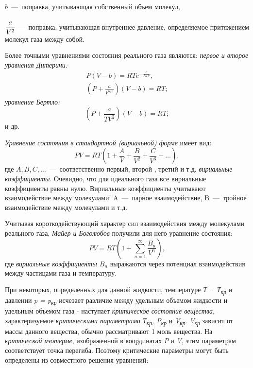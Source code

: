 $b$~---~поправка, учитывающая собственный объем молекул,

$\cfrac{a}{V^2}$~---~поправка, учитывающая внутреннее
давление, определяемое притяжением молекул газа между собой.

Более точными уравнениями состояния реального газа являются: \emph{первое и второе уравнения Дитеричи:}
\begin{gather}
  P(V-b) = RT e^{-\frac{a}{RTV}},\\
  \left (P + \frac{a}{V^{5/3}}\right )(V -b) = RT;
\end{gather}
\emph{уравнение Бертло:}
\begin{equation}
  \left (P + \frac{a}{TV^2}\right )(V -b) = RT;
\end{equation}
и др.

\emph{Уравнение состояния в стандартной (вириальной) форме} имеет вид:
\begin{equation}
  PV = RT\left ( 1+ \frac{A}{V} + \frac{B}{V^2} + \frac{C}{V^3} + \dots \right ),
\end{equation}
где $A, B, C, \dots$~---~соответственно первый, второй , третий и т.д. \emph{вириальные} \emph{коэффициенты}. Очевидно, что для идеального газа все вириальные коэффициенты равны нулю. Вириальные коэффициенты учитывают взаимодействие между молекулами: A~---~парное взаимодействие, B~---~тройное взаимодействие между молекулами и т.д.

Учитывая короткодействующий характер сил взаимодействия между молекулами
реального газа, \emph{Майер и Боголюбов} получили для него уравнение состояния:
\begin{equation}
  PV = RT \left ( 1+ \sum\limits_{n=1}^\infty\frac{B_n}{V^n}\right ),
\end{equation}
где \emph{вириальные коэффициенты $B_n$} выражаются через потенциал взаимодействия между частицами газа и температуру.

При некоторых, определенных для данной жидкости, температуре \emph{Т =
Т\textsubscript{кр}} и давлении \emph{p = p\textsubscript{кр}} исчезает
различие между удельным объемом жидкости и удельным объемом газа -
наступает \emph{критическое состояние вещества}, характеризуемое
\emph{критическими параметрами Т\textsubscript{кр}, P\textsubscript{кр}}
и \emph{V\textsubscript{кр}}. \emph{V\textsubscript{кр}} зависит от
массы данного вещества, обычно рассматривают 1 моль вещества. На
\emph{критической изотерме}, изображенной в координатах $P$ и
\emph{V}, этим параметрам соответствует точка перегиба. Поэтому
критические параметры могут быть определены из совместного решения
уравнений:

